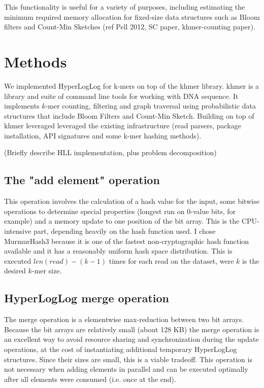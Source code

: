 \documentclass{bioinfo}
\begin{document}
This functionality is useful for a variety of purposes, including
estimating the minimum required memory allocation for fixed-size data
structures such as Bloom filters and Count-Min Sketches (ref Pell 2012,
SC paper, khmer-counting paper).





\section{Methods}

We implemented HyperLogLog for k-mers on top of the khmer library.
khmer is a library and suite of command line tools for working with
DNA sequence.  It implements $k$-mer counting, filtering and graph
traversal using probabilistic data structures that include Bloom
Filters and Count-Min Sketch.  Building on top of khmer leveraged
leveraged the existing infrastructure (read parsers, package
installation, API signatures and some k-mer hashing methods).

(Briefly describe HLL implementation, plus problem decomposition)

\subsection{The "add element" operation}

This operation involves the calculation of a hash value for the input,
some bitwise operations to determine special properties (longest run on 0-value bits, for example)
and a memory update to one position of the bit array.
This is the CPU-intensive part,
depending heavily on the hash function used.
I chose MurmurHash3 because it is one of the fastest non-cryptographic hash function available
and it has a reasonably uniform hash space distribution.
This is executed $len(read) - (k-1)$ times for each read on the dataset,
were $k$ is the desired $k$-mer size.

\subsection{HyperLogLog merge operation}

The merge operation is a elementwise max-reduction between two bit arrays.
Because the bit arrays are relatively small (about 128 KB) the merge operation is an excellent way to avoid resource sharing and synchronization during the update operations,
at the cost of instantiating additional temporary HyperLogLog structures.
Since their sizes are small,
this is a viable tradeoff.
This operation is not necessary when adding elements in parallel and can be executed
optimally after all elements were consumed (i.e. once at the end).
\end{document}

